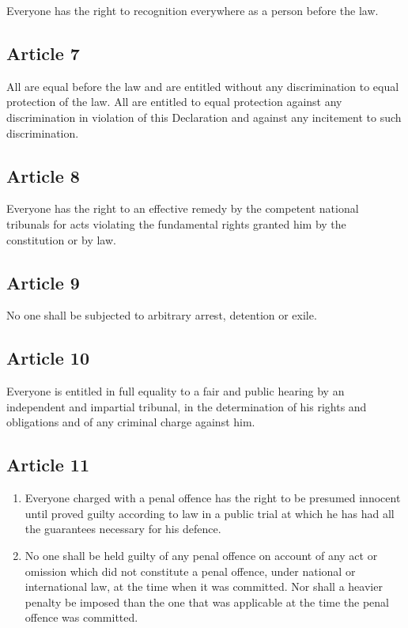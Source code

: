 \documentclass[
  ngerman,
  american,
  titlepage,
  openright,
  DIV=calc,
  toc=listof,
  listof=nochaptergap]{scrbook}
\begin{document}
Everyone has the right to recognition everywhere as a person before the
law.

\subsection{Article 7}\label{article-7-2}

All are equal before the law and are entitled without any discrimination
to equal protection of the law. All are entitled to equal protection
against any discrimination in violation of this Declaration and against
any incitement to such discrimination.

\subsection{Article 8}\label{article-8-2}

Everyone has the right to an effective remedy by the competent national
tribunals for acts violating the fundamental rights granted him by the
constitution or by law.

\subsection{Article 9}\label{article-9-2}

No one shall be subjected to arbitrary arrest, detention or exile.

\subsection{Article 10}\label{article-10-2}

Everyone is entitled in full equality to a fair and public hearing by an
independent and impartial tribunal, in the determination of his rights
and obligations and of any criminal charge against him.

\subsection{Article 11}\label{article-11-2}

\begin{enumerate}
\def\labelenumi{\arabic{enumi}.}
\item
  Everyone charged with a penal offence has the right to be presumed
  innocent until proved guilty according to law in a public trial at
  which he has had all the guarantees necessary for his defence.
\item
  No one shall be held guilty of any penal offence on account of any act
  or omission which did not constitute a penal offence, under national
  or international law, at the time when it was committed. Nor shall a
  heavier penalty be imposed than the one that was applicable at the
  time the penal offence was committed.
\end{enumerate}
\end{document}
